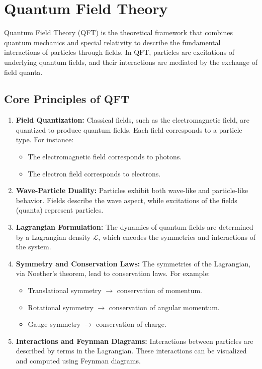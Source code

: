 \section{Quantum Field Theory}
Quantum Field Theory (QFT) is the theoretical framework that combines quantum mechanics and special relativity to describe the fundamental interactions of particles through fields. In QFT, particles are excitations of underlying quantum fields, and their interactions are mediated by the exchange of field quanta.

\subsection{Core Principles of QFT}
\begin{enumerate}
    \item \textbf{Field Quantization:} Classical fields, such as the electromagnetic field, are quantized to produce quantum fields. Each field corresponds to a particle type. For instance:
    \begin{itemize}
        \item The electromagnetic field corresponds to photons.
        \item The electron field corresponds to electrons.
    \end{itemize}

    \item \textbf{Wave-Particle Duality:} Particles exhibit both wave-like and particle-like behavior. Fields describe the wave aspect, while excitations of the fields (quanta) represent particles.

    \item \textbf{Lagrangian Formulation:} The dynamics of quantum fields are determined by a Lagrangian density \(\mathcal{L}\), which encodes the symmetries and interactions of the system.
    
    \item \textbf{Symmetry and Conservation Laws:} The symmetries of the Lagrangian, via Noether's theorem, lead to conservation laws. For example:
    \begin{itemize}
        \item Translational symmetry \(\rightarrow\) conservation of momentum.
        \item Rotational symmetry \(\rightarrow\) conservation of angular momentum.
        \item Gauge symmetry \(\rightarrow\) conservation of charge.
    \end{itemize}

    \item \textbf{Interactions and Feynman Diagrams:} Interactions between particles are described by terms in the Lagrangian. These interactions can be visualized and computed using Feynman diagrams.
\end{enumerate}

